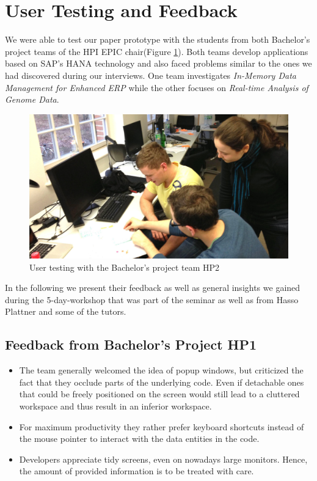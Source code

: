 
\section{User Testing and Feedback}
\label{sec:USER_TESTING}

We were able to test our paper prototype with the students from both Bachelor's project teams of the HPI EPIC chair(Figure \ref{fig:user_testing}). Both teams develop applications based on SAP's HANA technology and also faced problems similar to the ones we had discovered during our interviews. One team investigates \emph{In-Memory Data Management for Enhanced ERP} while the other focuses on \emph{Real-time Analysis of Genome Data}.

\begin{figure}
\begin{centering}
    \includegraphics[width=1.0\linewidth]{images/user_testing}
    \caption{User testing with the Bachelor's project team HP2}
    \label{fig:user_testing}
\end{centering}
\end{figure}

In the following we present their feedback as well as general insights we gained during the 5-day-workshop that was part of the seminar as well as from Hasso Plattner and some of the tutors.

\subsection{Feedback from Bachelor's Project HP1}
\label{subsec:FeedbackBPHP1}
\begin{itemize}
	\item The team generally welcomed the idea of popup windows, but criticized the fact that they occlude parts of the underlying code. Even if detachable ones that could be freely positioned on the screen would still lead to a cluttered workspace and thus result in an inferior workspace.

	\item For maximum productivity they rather prefer keyboard shortcuts instead of the mouse pointer to interact with the data entities in the code.

	\item Developers appreciate tidy screens, even on nowadays large monitors. Hence, the amount of provided information is to be treated with care.
\end{itemize}

